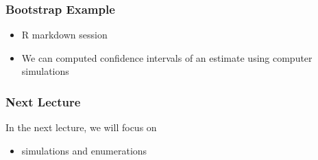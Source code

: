 \documentclass[10pt]{beamer}
\begin{document}
\begin{frame}
\frametitle{Bootstrap Example}

\begin{itemize}
\item R markdown session
\item We can computed confidence intervals of an estimate using computer simulations
\end{itemize}

\end{frame}

\begin{frame}
\frametitle{Next Lecture}

In the next lecture, we will focus on
\begin{itemize}
\item simulations and enumerations
\end{itemize}

\end{frame}
\end{document}
